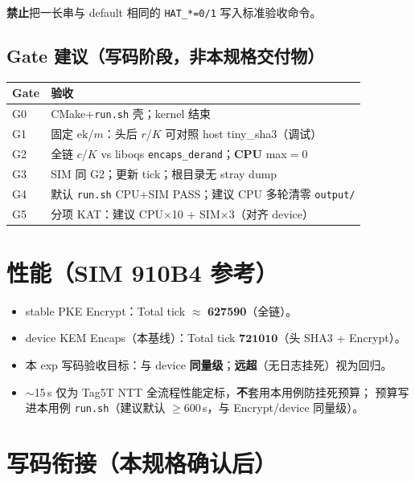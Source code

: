 \documentclass[UTF8,a4paper,11pt]{ctexart}
\begin{document}
\textbf{禁止}把一长串与 default 相同的 \texttt{HAT\_*=0/1} 写入标准验收命令。

\subsection{Gate 建议（写码阶段，非本规格交付物）}

\begin{longtable}{@{}L{1.4cm}L{11.4cm}@{}}
\toprule
Gate & 验收 \\
\midrule
G0 & CMake+\texttt{run.sh} 壳；kernel 结束 \\
G1 & 固定 $\mathrm{ek}$/$m$：头后 $r$/$K$ 可对照 host tiny\_sha3（调试） \\
G2 & 全链 $c$/$K$ vs liboqs \texttt{encaps\_derand}；\textbf{CPU} max$=$0 \\
G3 & SIM 同 G2；更新 tick；根目录无 stray dump \\
G4 & 默认 \texttt{run.sh} CPU+SIM PASS；建议 CPU 多轮清零 \texttt{output/} \\
G5 & 分项 KAT：建议 CPU$\times$10 + SIM$\times$3（对齐 device） \\
\bottomrule
\end{longtable}

\section{性能（SIM 910B4 参考）}
\label{sec:perf}

\begin{itemize}
  \item stable PKE Encrypt：Total tick $\approx$ \textbf{627590}（全链）。
  \item device KEM Encaps（本基线）：Total tick $\mathbf{721010}$（头 SHA3 + Encrypt）。
  \item 本 exp 写码验收目标：与 device \textbf{同量级}；\textbf{远超}（无日志挂死）视为回归。
  \item $\sim$15\,s 仅为 Tag5T NTT 全流程性能定标，\textbf{不}套用本用例防挂死预算；
        预算写进本用例 \texttt{run.sh}（建议默认 $\ge$600\,s，与 Encrypt/device 同量级）。
\end{itemize}

\section{写码衔接（本规格确认后）}
\label{sec:next}
\end{document}
